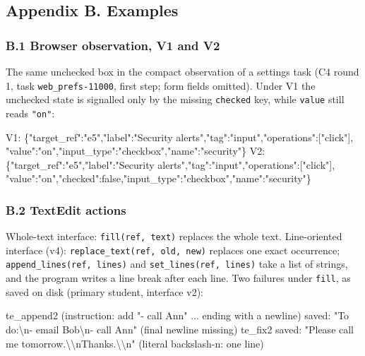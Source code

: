 \documentclass[
  10pt,
]{article}
\newenvironment{Shaded}{}{}
\newcommand{\NormalTok}[1]{#1}
\begin{document}
\subsection{Appendix B. Examples}\label{appendix-b.-examples}

\subsubsection{B.1 Browser observation, V1 and
V2}\label{b.1-browser-observation-v1-and-v2}

The same unchecked box in the compact observation of a settings task (C4
round 1, task \texttt{web\_prefs-11000}, first step; form fields
omitted). Under V1 the unchecked state is signalled only by the missing
\texttt{checked} key, while \texttt{value} still reads \texttt{"on"}:

\begin{Shaded}
\begin{Highlighting}[]
\NormalTok{V1: \{"target\_ref":"e5","label":"Security alerts","tag":"input","operations":["click"],}
\NormalTok{     "value":"on","input\_type":"checkbox","name":"security"\}}
\NormalTok{V2: \{"target\_ref":"e5","label":"Security alerts","tag":"input","operations":["click"],}
\NormalTok{     "value":"on","checked":false,"input\_type":"checkbox","name":"security"\}}
\end{Highlighting}
\end{Shaded}

\subsubsection{B.2 TextEdit actions}\label{b.2-textedit-actions}

Whole-text interface: \texttt{fill(ref,\ text)} replaces the whole text.
Line-oriented interface (v4): \texttt{replace\_text(ref,\ old,\ new)}
replaces one exact occurrence; \texttt{append\_lines(ref,\ lines)} and
\texttt{set\_lines(ref,\ lines)} take a list of strings, and the program
writes a line break after each line. Two failures under \texttt{fill},
as saved on disk (primary student, interface v2):

\begin{Shaded}
\begin{Highlighting}[]
\NormalTok{te\_append2 (instruction: add "{-} call Ann" ... ending with a newline)}
\NormalTok{  saved: "To do:\textbackslash{}n{-} email Bob\textbackslash{}n{-} call Ann"          (final newline missing)}
\NormalTok{te\_fix2}
\NormalTok{  saved: "Please call me tomorrow.\textbackslash{}\textbackslash{}nThanks.\textbackslash{}\textbackslash{}n"     (literal backslash{-}n: one line)}
\end{Highlighting}
\end{Shaded}
\end{document}
